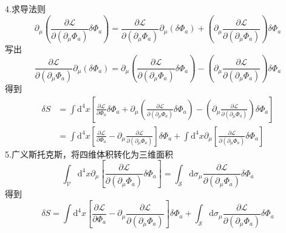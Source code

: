 4.求导法则
\begin{equation}
    \partial _{\mu}\left( \frac{\partial \mathcal{L}}{\partial \left( \partial _{\mu}\Phi _a \right)}\delta \Phi _a \right) =\frac{\partial \mathcal{L}}{\partial \left( \partial _{\mu}\Phi _a \right)}\partial _{\mu}\left( \delta \Phi _a \right) +\left( \partial _{\mu}\frac{\partial \mathcal{L}}{\partial \left( \partial _{\mu}\Phi _a \right)} \right) \delta \Phi _a
\end{equation}
写出
\begin{equation}
    \frac{\partial \mathcal{L}}{\partial \left( \partial _{\mu}\Phi _a \right)}\partial _{\mu}\left( \delta \Phi _a \right) =\partial _{\mu}\left( \frac{\partial \mathcal{L}}{\partial \left( \partial _{\mu}\Phi _a \right)}\delta \Phi _a \right) -\left( \partial _{\mu}\frac{\partial \mathcal{L}}{\partial \left( \partial _{\mu}\Phi _a \right)} \right) \delta \Phi _a
\end{equation}
得到
\begin{equation}
    \begin{aligned}
        \delta S&=\int{\mathrm{d}^4x}\left[ \frac{\partial \mathcal{L}}{\partial \Phi _a}\delta \Phi _a+\partial _{\mu}\left( \frac{\partial \mathcal{L}}{\partial \left( \partial _{\mu}\Phi _a \right)}\delta \Phi _a \right) -\left( \partial _{\mu}\frac{\partial \mathcal{L}}{\partial \left( \partial _{\mu}\Phi _a \right)} \right) \delta \Phi _a \right] 
\\
&=\int{\mathrm{d}^4x}\left[ \frac{\partial \mathcal{L}}{\partial \Phi _a}-\partial _{\mu}\frac{\partial \mathcal{L}}{\partial \left( \partial _{\mu}\Phi _a \right)} \right] \delta \Phi _a+\int{\mathrm{d}^4x}\partial _{\mu}\left[ \frac{\partial \mathcal{L}}{\partial \left( \partial _{\mu}\Phi _a \right)}\delta \Phi _a \right] 
    \end{aligned}
\end{equation}
5.广义斯托克斯，将四维体积转化为三维面积
\begin{equation}
    \int_{\mathcal{V}}{\mathrm{d}^4x}\partial _{\mu}\left[ \frac{\partial \mathcal{L}}{\partial \left( \partial _{\mu}\Phi _a \right)}\delta \Phi _a \right] =\int_{\mathcal{S}}{\mathrm{d}\sigma _{\mu}}\frac{\partial \mathcal{L}}{\partial \left( \partial _{\mu}\Phi _a \right)}\delta \Phi _a
\end{equation}
得到
\begin{equation}
    \delta S=\int{\mathrm{d}^4x}\left[ \frac{\partial \mathcal{L}}{\partial \Phi _a}-\partial _{\mu}\frac{\partial \mathcal{L}}{\partial \left( \partial _{\mu}\Phi _a \right)} \right] \delta \Phi _a+\int_{\mathcal{S}}{\mathrm{d}\sigma _{\mu}}\frac{\partial \mathcal{L}}{\partial \left( \partial _{\mu}\Phi _a \right)}\delta \Phi _a
\end{equation}
